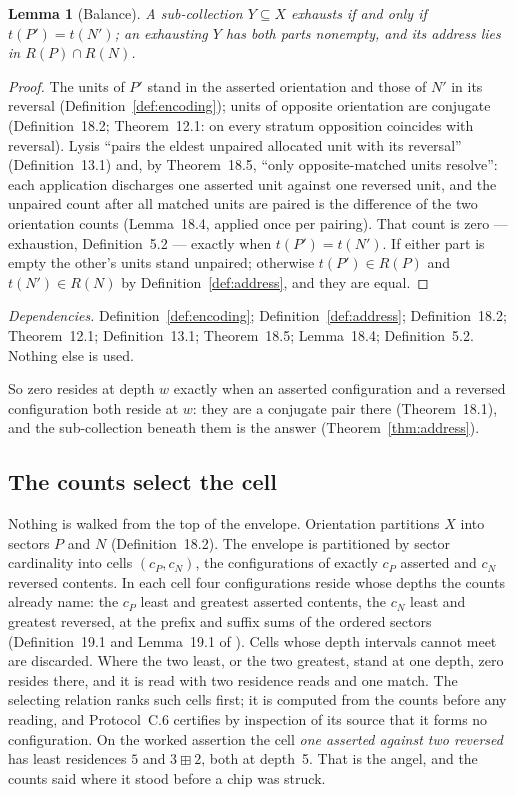 \documentclass[pdflatex,sn-mathphys-num]{sn-jnl}
\theoremstyle{thmstyleone}%
\newtheorem{lemma}[theorem]{Lemma}
\theoremstyle{thmstyletwo}%
\theoremstyle{thmstylethree}%
\newtheorem{lemma}[theorem]{Lemma}
\newcommand{\PA}{\cite{Swanagon2026PA}}
\newcommand{\q}[1]{``#1''}        %
\newcommand{\deps}[1]{\par\begin{sloppypar}\noindent\emph{Dependencies.} #1 Nothing else is used.\end{sloppypar}}
\begin{document}
\begin{lemma}[Balance]\label{lem:balance}
A sub-collection $Y\subseteq X$ exhausts if and only if $t(P')=t(N')$; an exhausting $Y$ has both parts nonempty, and its address lies in $R(P)\cap R(N)$.
\end{lemma}
\begin{proof}
The units of $P'$ stand in the asserted orientation and those of $N'$ in its reversal (Definition~\ref{def:encoding}); units of opposite orientation are conjugate (Definition~18.2; Theorem~12.1: on every stratum opposition coincides with reversal). Lysis \q{pairs the eldest unpaired allocated unit with its reversal} (Definition~13.1) and, by Theorem~18.5, \q{only opposite-matched units resolve}: each application discharges one asserted unit against one reversed unit, and the unpaired count after all matched units are paired is the difference of the two orientation counts (Lemma~18.4, applied once per pairing). That count is zero --- exhaustion, Definition~5.2 --- exactly when $t(P')=t(N')$. If either part is empty the other's units stand unpaired; otherwise $t(P')\in R(P)$ and $t(N')\in R(N)$ by Definition~\ref{def:address}, and they are equal.
\end{proof}
\deps{Definition~\ref{def:encoding}; Definition~\ref{def:address}; Definition~18.2; Theorem~12.1; Definition~13.1; Theorem~18.5; Lemma~18.4; Definition~5.2.}

\noindent So zero resides at depth $w$ exactly when an asserted configuration and a reversed configuration both reside at $w$: they are a conjugate pair there (Theorem~18.1), and the sub-collection beneath them is the answer (Theorem~\ref{thm:address}).

\subsection{The counts select the cell}
Nothing is walked from the top of the envelope. Orientation partitions $X$ into sectors $P$ and $N$ (Definition~18.2). The envelope is partitioned by sector cardinality into cells $(c_P,c_N)$, the configurations of exactly $c_P$ asserted and $c_N$ reversed contents. In each cell four configurations reside whose depths the counts already name: the $c_P$ least and greatest asserted contents, the $c_N$ least and greatest reversed, at the prefix and suffix sums of the ordered sectors (Definition~19.1 and Lemma~19.1 of \PA). Cells whose depth intervals cannot meet are discarded. Where the two least, or the two greatest, stand at one depth, zero resides there, and it is read with two residence reads and one match. The selecting relation ranks such cells first; it is computed from the counts before any reading, and Protocol~C.6 certifies by inspection of its source that it forms no configuration. On the worked assertion the cell \emph{one asserted against two reversed} has least residences $5$ and $3\boxplus 2$, both at depth~5. That is the angel, and the counts said where it stood before a chip was struck.
\end{document}
